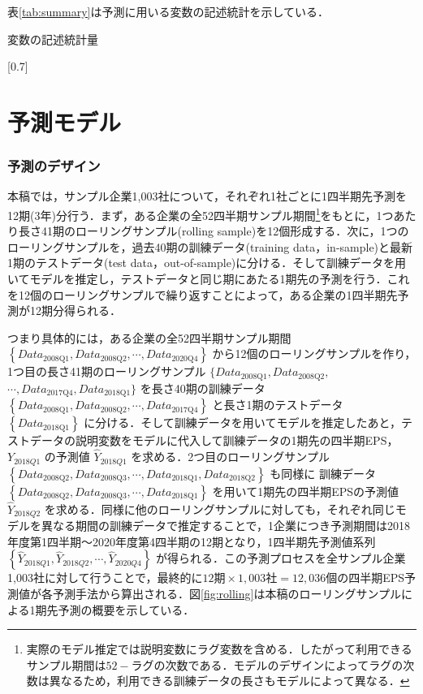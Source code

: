 \documentclass[a4paper，12pt]{jsarticle}
\begin{document}
表\ref{tab:summary}は予測に用いる変数の記述統計を示している．

\begin{table}
  \centering
  \caption{変数の記述統計量}
  \label{tab:summary}
  \scalebox{0.7}[0.7]{
    
  }
\end{table}

    
\part{予測モデル} \label{par:model}

\section{予測のデザイン}

本稿では，サンプル企業1,003社について，それぞれ1社ごとに1四半期先予測を12期(3年)分行う．まず，ある企業の全52四半期サンプル期間\footnote{実際のモデル推定では説明変数にラグ変数を含める．したがって利用できるサンプル期間は$52 - ラグの次数$である．モデルのデザインによってラグの次数は異なるため，利用できる訓練データの長さもモデルによって異なる．}をもとに，1つあたり長さ41期のローリングサンプル(rolling sample)を12個形成する．次に，1つのローリングサンプルを，過去40期の訓練データ(training data，in-sample)と最新1期のテストデータ(test data，out-of-sample)に分ける．そして訓練データを用いてモデルを推定し，テストデータと同じ期にあたる1期先の予測を行う．これを12個のローリングサンプルで繰り返すことによって，ある企業の1四半期先予測が12期分得られる．

つまり具体的には，ある企業の全52四半期サンプル期間 $\left\{Data_{\text{2008Q1}}, Data_{\text{2008Q2}}, \cdots, Data_{\text{2020Q4}}\right\}$ から12個のローリングサンプルを作り，1つ目の長さ41期のローリングサンプル $\{Data_{\text{2008Q1}}, Data_{\text{2008Q2}},$ $\cdots, Data_{\text{2017Q4}}, Data_{\text{2018Q1}}\}$ を長さ40期の訓練データ $\left\{Data_{\text{2008Q1}}, Data_{\text{2008Q2}}, \cdots, Data_{\text{2017Q4}}\right\}$ と長さ1期のテストデータ $\left\{Data_{\text{2018Q1}}\right\}$ に分ける．そして訓練データを用いてモデルを推定したあと，テストデータの説明変数をモデルに代入して訓練データの1期先の四半期EPS，$Y_{2018Q1}$ の予測値 $\hat{Y}_{2018Q1}$ を求める．2つ目のローリングサンプル $\left\{Data_{\text{2008Q2}}, Data_{\text{2008Q3}}, \cdots, Data_{\text{2018Q1}}, Data_{\text{2018Q2}}\right\}$ も同様に 訓練データ $\left\{Data_{\text{2008Q2}}, Data_{\text{2008Q3}}, \cdots, Data_{\text{2018Q1}}\right\}$ を用いて1期先の四半期EPSの予測値 $\hat{Y}_{2018Q2}$ を求める．同様に他のローリングサンプルに対しても，それぞれ同じモデルを異なる期間の訓練データで推定することで，1企業につき予測期間は2018年度第1四半期～2020年度第4四半期の12期となり，1四半期先予測値系列 $\left\{\hat{Y}_{2018Q1}, \hat{Y}_{2018Q2}, \cdots, \hat{Y}_{2020Q4}\right\}$ が得られる．この予測プロセスを全サンプル企業1,003社に対して行うことで，最終的に$12期 \times 1,003社 = 12,036個$の四半期EPS予測値が各予測手法から算出される．図\ref{fig:rolling}は本稿のローリングサンプルによる1期先予測の概要を示している．
\end{document}
